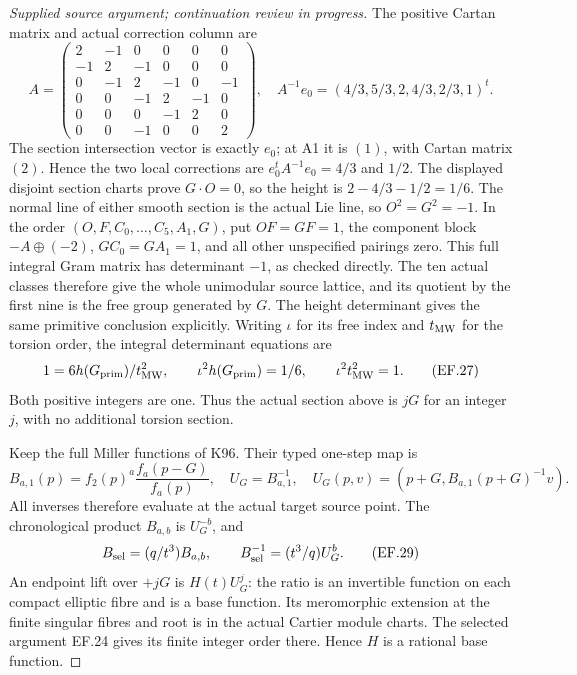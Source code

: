 \begin{proof}[Supplied source argument; continuation review in progress]
The positive Cartan matrix and actual correction column are
\[
 A=\begin{pmatrix}
 2&-1&0&0&0&0\\-1&2&-1&0&0&0\\
 0&-1&2&-1&0&-1\\0&0&-1&2&-1&0\\
 0&0&0&-1&2&0\\0&0&-1&0&0&2
 \end{pmatrix},\quad
 A^{-1}e_0=(4/3,5/3,2,4/3,2/3,1)^t.
 \tag{EF.26a}
\]
The section intersection vector is exactly \(e_0\); at A1 it is
\((1)\), with Cartan matrix \((2)\). Hence the two local corrections
are \(e_0^tA^{-1}e_0=4/3\) and \(1/2\). The displayed disjoint
section charts prove \(G\cdot O=0\), so the height is
\(2-4/3-1/2=1/6\). The normal line of either smooth section is the
actual Lie line, so \(O^2=G^2=-1\). In the order
\((O,F,C_0,\ldots,C_5,A_1,G)\), put \(OF=GF=1\), the component block
\(-A\oplus(-2)\), \(G C_0=G A_1=1\), and all other unspecified
pairings zero. This full integral Gram matrix has determinant \(-1\),
as checked directly. The ten actual classes therefore give the whole
unimodular source lattice, and its quotient by the first nine is the
free group generated by \(G\). The height determinant gives the same
primitive conclusion explicitly. Writing \(\iota\) for its free index and
\(t_{\rm MW}\) for the torsion order, the integral determinant
equations are
\[
 1=6h(G_{\rm prim})/t_{\rm MW}^2,\qquad
 \iota^2h(G_{\rm prim})=1/6,\qquad
                         \iota^2t_{\rm MW}^2=1.
 \tag{EF.27}
\]
Both positive integers are one. Thus the actual section above is
\(jG\) for an integer \(j\), with no additional torsion section.

Keep the full Miller functions of K96. Their typed one-step map is
\[
 B_{a,1}(p)=f_2(p)^a\frac{f_a(p-G)}{f_a(p)},\quad
 U_G=B_{a,1}^{-1},\quad
 U_G(p,v)=(p+G,B_{a,1}(p+G)^{-1}v).
 \tag{EF.28}
\]
All inverses therefore evaluate at the actual target source point.
The chronological product \(B_{a,b}\) is \(U_G^{-b}\), and
\[
 B_{\rm sel}=(q/t^3)B_{a,b},\qquad
              B_{\rm sel}^{-1}=(t^3/q)U_G^b.
 \tag{EF.29}
\]
An endpoint lift over \(+jG\) is \(H(t)U_G^j\): the ratio is an
invertible function on each compact elliptic fibre and is a base
function. Its meromorphic extension at the finite singular fibres and
root is in the actual Cartier module charts. The selected argument
EF.24 gives its finite integer order there. Hence \(H\) is a rational
base function.


\end{proof}
